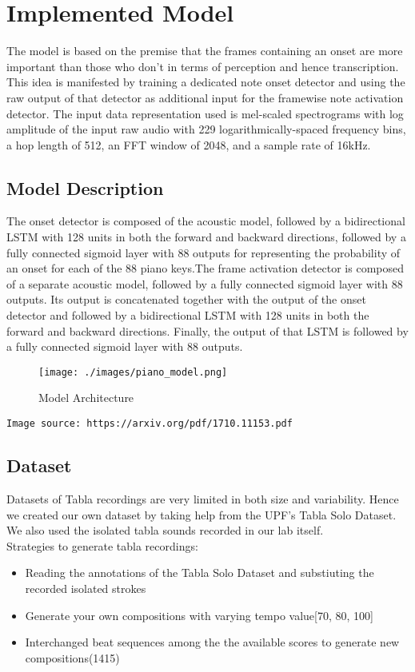 \chapter{Implemented Model}

The model is based on the premise that the frames containing an onset are more important than those who don’t in terms of perception and hence transcription. This idea is manifested by training a dedicated note onset detector and using the raw output of that detector as additional input for the framewise note activation detector. The input data representation used is mel-scaled spectrograms with log amplitude of the input raw audio with 229 logarithmically-spaced frequency bins, a hop length of 512, an FFT window of 2048, and a sample rate of 16kHz.


\section*{Model Description}
The onset detector is composed of the acoustic model, followed by a bidirectional LSTM with 128 units in both the forward and backward directions, followed by a fully connected sigmoid layer with 88 outputs for representing the probability of an onset for each of the 88 piano keys.The frame activation detector is composed of a separate acoustic model, followed by a fully connected sigmoid layer with 88 outputs. Its output is concatenated together with the output of the onset detector and followed by a bidirectional LSTM with 128 units in both the forward and backward directions. Finally, the output of that LSTM is followed by a fully connected sigmoid layer with 88 outputs.
 
\begin{figure}[h!]
  \texttt{[image: ./images/piano\_model.png]}
  \caption{Model Architecture}
  \label{}
\end{figure}

\texttt{Image source: https://arxiv.org/pdf/1710.11153.pdf}


\section*{Dataset}
Datasets of Tabla recordings are very limited in both size and variability. Hence we created our own dataset by taking help from the UPF’s Tabla Solo Dataset. We also used the isolated tabla sounds recorded in our lab itself. \\ 
Strategies to generate tabla recordings:
\begin{itemize}
\item Reading the annotations of the Tabla Solo Dataset and substiuting
the recorded isolated strokes
\item Generate your own compositions with varying tempo value[70, 80, 100]
\item Interchanged beat sequences among the the available scores to
generate new compositions(1415)
\end{itemize}

